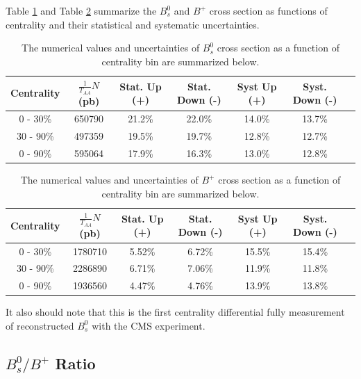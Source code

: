 Table \ref{BsXsectCent} and Table \ref{BPXsectCent} summarize the $B^0_s$ and $B^+$ cross section as functions of centrality and their statistical and systematic uncertainties.




\begin{table}[h]
\begin{center}
\caption{The numerical values and uncertainties of $B^0_s$ cross section as a function of centrality bin are summarized below.}
\vspace{1em}
\label{BsXsectCent}
  \begin{tabular}{| c | c |c | c| c| c| c|}
    \hline
Centrality &  $\frac{1}{T_{AA}} N$ (pb) & Stat. Up (+)   & Stat. Down (-)  &  Syst Up (+)  &  Syst. Down (-) \\
    \hline
    \hline
0 - 30\% &   650790  &  21.2\% & 22.0\% & 14.0\% & 13.7\% \\ 
30 - 90\%  & 497359  & 19.5\%  & 19.7\%  & 12.8\% & 12.7\% \\ 
0 - 90\% &  595064 & 17.9\%   &  16.3\% & 13.0\% & 12.8\% \\ 
    \hline
    \hline
\end{tabular}
\end{center}
\end{table}


\begin{table}[h]
\begin{center}
\caption{The numerical values and uncertainties of $B^+$ cross section as a function of centrality bin are summarized below.}
\vspace{1em}
\label{BPXsectCent}
  \begin{tabular}{| c | c |c | c| c| c| c|}
    \hline
Centrality &  $\frac{1}{T_{AA}} N$ (pb) & Stat. Up (+)   & Stat. Down (-)  &  Syst Up (+)  &  Syst. Down (-) \\
    \hline
    \hline
0 - 30\% &   1780710  &  5.52\% & 6.72\% & 15.5\% & 15.4\% \\ 
30 - 90\%  & 2286890  & 6.71\%  & 7.06\%  & 11.9\% & 11.8\% \\ 
0 - 90\% &  1936560 & 4.47\%   &  4.76\% & 13.9\% & 13.8\% \\ 
    \hline
    \hline
\end{tabular}
\end{center}
\end{table}



It also should note that this is the first centrality differential fully measurement of reconstructed $B^0_s$ with the CMS experiment. 






\subsection{$B^0_s/B^{+}$ Ratio}
















